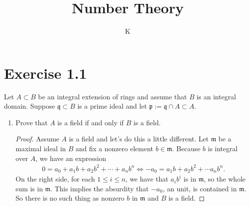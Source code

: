 \documentclass[a4paper]{article}
\title{Number Theory}
\author{K}
\begin{document}
\section*{Exercise 1.1}
Let \(A \subset B\) be an integral extension of rings and assume that \(B\) is an integral domain. Suppose \(\mathfrak{q} \subset B\) is a prime ideal and let \(\mathfrak{p} := 
\mathfrak{q} \cap A \subset A\).
\begin{enumerate}
  \item Prove that \(A\) is a field if and only if \(B\) is a field.
  \begin{proof}
    Assume \(A\) is a field and let's do this a little different. Let \(\mathfrak{m}\) be a maximal ideal in \(B\) and fix a nonzero element \(b \in \mathfrak{m}\). Because \(b\) is integral over \(A\), we have an expression
    \begin{align*}
      0 = a_0 + a_1 b + a_2 b^2 + \cdots + a_n b^n \iff -a_0 = a_1 b + a_2 b^2 + \cdots a_n b^n \text{.}
    \end{align*}
    On the right side, for each \(1 \leq i \leq n\), we have that \(a_i b^i\) is in \(\mathfrak{m}\), so the whole sum is in \(\mathfrak{m}\). This implies the absurdity that \(-a_0\), an unit, is contained in \(\mathfrak{m}\). So there is no such thing as nonzero \(b\) in \(\mathfrak{m}\) and \(B\) is a field.
    

\end{proof}
\end{enumerate}
\end{document}
